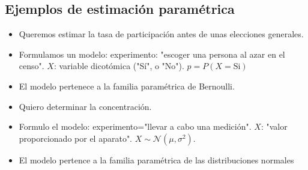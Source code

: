 \subsection{Ejemplos de estimación paramétrica}
\begin{tcolorbox}[colback=blue!5!white, colframe=blue!75!black, title=\textbf{Sondeo sobre intención de participación en una elecciones}]
\begin{itemize}[label=\textbullet]
    \item Queremos estimar la tasa de participación antes de unas elecciones generales.
    \item Formulamos un modelo: experimento: "escoger una persona al azar en el censo". $X$: variable dicotómica ("Sí", o "No").  $p=P(X=\mathrm{Si})$
    \item El modelo pertenece a la familia paramétrica de Bernoulli.
\end{itemize}
\end{tcolorbox}
\begin{tcolorbox}[colback=blue!5!white, colframe=blue!75!black, title=\textbf{Determinación de la concentración de un producto}]
\begin{itemize}[label=\textbullet]
    \item Quiero determinar la concentración.
    \item Formulo el modelo: experimento="llevar a cabo una medición". $X$: "valor proporcionado por el aparato".  $X\sim \mathcal{N}(\mu,\sigma^2)$.
    \item El modelo pertence a la familia paramétrica de las distribuciones normales
\end{itemize}
\end{tcolorbox}

